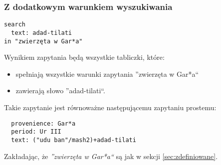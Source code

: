 \subsubsection{Z dodatkowym warunkiem wyszukiwania}
\begin{verbatim}
search
  text: adad-tilati
in "zwierzęta w Gar*a"
\end{verbatim}
Wynikiem zapytania będą wszystkie tabliczki, które:
\begin{itemize}
 \item spełniają wszystkie warunki zapytania ''zwierzęta w Gar*a``
\item zawierają słowo ''adad-tilati``.
\end{itemize}
Takie zapytanie jest równoważne następującemu zapytaniu prostemu:
\begin{verbatim}
  provenience: Gar*a
  period: Ur III
  text: ("udu ban"/mash2)+adad-tilati
\end{verbatim}
Zakładając, że \textit{''zwierzęta w Gar*a``} są jak w sekcji \ref{sec:zdefiniowane}.

